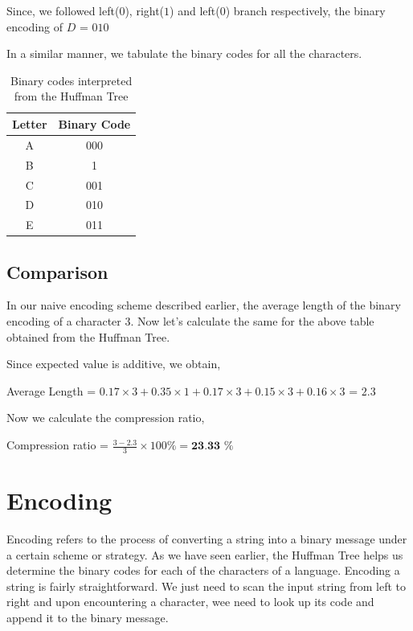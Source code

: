 \documentclass[18pt]{article}
\begin{document}
	Since, we followed left($0$), right($1$) and left($0$) branch respectively,  the binary encoding of $D$ = \textbf{$010$}
	
	In a similar manner, we tabulate the binary codes for all the characters.
	
	\begin{table}[h]
		\centering
		\begin{tabular}{|c|c|}
			\hline
			\textbf{Letter} & \textbf{Binary Code} \\
			\hline
			A & 000  \\
			B & 1  \\
			C & 001 \\
			D & 010 \\
			E & 011 \\
			\hline
		\end{tabular}
		\caption{Binary codes interpreted from the Huffman Tree}
	\end{table}
	
	
	\subsection{Comparison}
	
	In our naive encoding scheme described earlier, the average length of the binary encoding of a character $3$. Now let’s calculate the same for the above table obtained from the Huffman Tree.
	
	Since expected value is additive, we obtain,
	
	Average Length = $0.17 \times 3 + 0.35 \times 1 + 0.17 \times 3 + 0.15 \times 3 + 0.16 \times 3$ = $2.3$
	
	Now we calculate the compression ratio,
	
	Compression ratio = $\frac{3-2.3}{3} \times 100 \% = \textbf{23.33 \%} $
	
	\newpage
	
	\section{Encoding}
	
	Encoding refers to the process of converting a string into a binary message under a certain scheme or strategy. As we have seen earlier, the Huffman Tree helps us determine the binary codes for each of the characters of a language. Encoding a string is fairly straightforward. We just need to scan the input string from left to right and upon encountering a character, wee need to look up its code and append it to the binary message.
	
\end{document}
